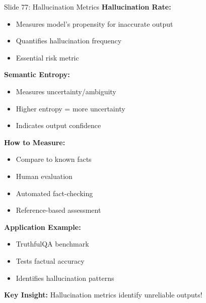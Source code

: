 \documentclass[8pt]{beamer}
\begin{document}
	\begin{frame}{Slide 77: Hallucination Metrics}
		\fontsize{6.5}{7.5}\selectfont
		\textbf{Hallucination Rate:}
		\begin{itemize}
			\item Measures model's propensity for inaccurate output
			\item Quantifies hallucination frequency
			\item Essential risk metric
		\end{itemize}
		
		\vspace{0.1cm}
		\textbf{Semantic Entropy:}
		\begin{itemize}
			\item Measures uncertainty/ambiguity
			\item Higher entropy = more uncertainty
			\item Indicates output confidence
		\end{itemize}
		
		\vspace{0.1cm}
		\textbf{How to Measure:}
		\begin{itemize}
			\item Compare to known facts
			\item Human evaluation
			\item Automated fact-checking
			\item Reference-based assessment
		\end{itemize}
		
		\vspace{0.1cm}
		\textbf{Application Example:}
		\begin{itemize}
			\item TruthfulQA benchmark
			\item Tests factual accuracy
			\item Identifies hallucination patterns
		\end{itemize}
		
		\textcolor{myblue}{\textbf{Key Insight:}} Hallucination metrics identify unreliable outputs!
	\end{frame}
	
\end{document}
